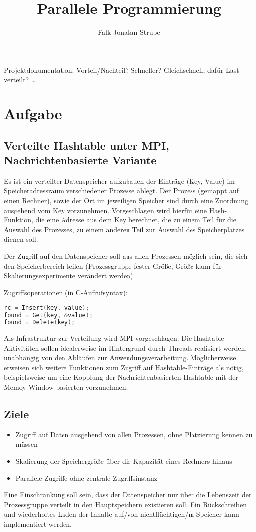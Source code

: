 \documentclass{scrreprt}
\title{Parallele Programmierung}
\author{Falk-Jonatan Strube}
\begin{document}
\maketitle
\tableofcontents

Projektdokumentation: Vorteil/Nachteil? Schneller? Gleichschnell, dafür Last verteilt? …

\chapter{Aufgabe}
\section{Verteilte Hashtable  unter MPI,  Nachrichtenbasierte Variante}
Es ist ein verteilter Datenspeicher aufzubauen der Einträge (Key, Value) im Speicheradressraum verschiedener Prozesse ablegt. Der Prozess (gemappt auf einen Rechner), sowie der Ort im jeweiligen Speicher sind durch eine Zuordnung ausgehend vom Key vorzunehmen. Vorgeschlagen wird hierfür eine Hash-Funktion, die eine Adresse aus dem Key berechnet, die zu einem Teil für die Auswahl des Prozesses, zu einem anderen Teil zur Auswahl des Speicherplatzes dienen soll.

Der Zugriff auf den Datenspeicher soll aus allen Prozessen möglich sein, die sich den Speicherbereich teilen (Prozessgruppe fester Größe, Größe kann für Skalierungsexperimente verändert werden).

Zugriffsoperationen  (in C-Aufrufsyntax): 

\begin{lstlisting}[language=C]
rc = Insert(key, value);
found = Get(key, &value);
found = Delete(key);
\end{lstlisting}

Als Infrastruktur zur Verteilung wird MPI vorgeschlagen. Die Hashtable-Aktivitäten sollen idealerweise im Hintergrund durch Threads realisiert werden, unabhängig von den Abläufen zur Anwendungsverarbeitung. Möglicherweise erweisen sich weitere Funktionen zum Zugriff auf Hashtable-Einträge als nötig, beispielsweise um eine Kopplung der Nachrichtenbasierten Hashtable mit der Memoy-Window-basierten vorzunehmen.

\section{Ziele}
\begin{itemize}
\item Zugriff auf Daten ausgehend von allen Prozessen, ohne Platzierung kennen zu müssen
\item Skalierung der Speichergröße über die Kapazität eines Rechners hinaus
\item Parallele Zugriffe ohne zentrale Zugriffsinstanz
\end{itemize}
Eine Einschränkung soll sein, dass der Datenspeicher nur über die Lebenszeit der Prozessgruppe verteilt in den Hauptspeichern existieren soll. Ein Rückschreiben und wiederholtes Laden der Inhalte auf/von nichtflüchtigen/m Speicher kann implementiert werden.
\end{document}

